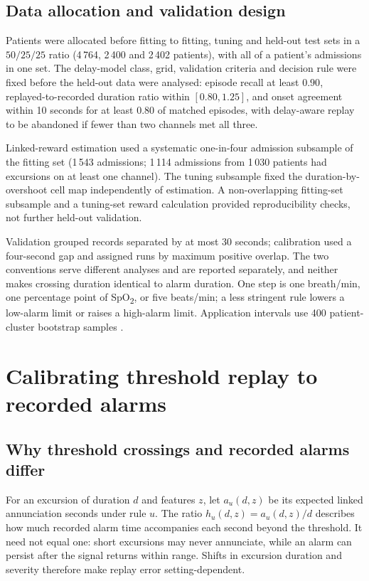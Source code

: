 \documentclass[11pt,letterpaper]{article}
\newcommand{\SpO}{SpO\textsubscript{2}}
\begin{document}
\subsection{Data allocation and validation design}\label{sec:design}

Patients were allocated before fitting to fitting, tuning and held-out test sets in a $50/25/25$ ratio (4\,764, 2\,400 and 2\,402 patients), with all of a patient's admissions in one set. The delay-model class, grid, validation criteria and decision rule were fixed before the held-out data were analysed: episode recall at least $0.90$, replayed-to-recorded duration ratio within $[0.80,1.25]$, and onset agreement within 10 seconds for at least $0.80$ of matched episodes, with delay-aware replay to be abandoned if fewer than two channels met all three.

Linked-reward estimation used a systematic one-in-four admission subsample of the fitting set (1\,543 admissions; 1\,114 admissions from 1\,030 patients had excursions on at least one channel). The tuning subsample fixed the duration-by-overshoot cell map independently of estimation. A non-overlapping fitting-set subsample and a tuning-set reward calculation provided reproducibility checks, not further held-out validation.

Validation grouped records separated by at most 30 seconds; calibration used a four-second gap and assigned runs by maximum positive overlap. The two conventions serve different analyses and are reported separately, and neither makes crossing duration identical to alarm duration. One step is one breath/min, one percentage point of \SpO{}, or five beats/min; a less stringent rule lowers a low-alarm limit or raises a high-alarm limit. Application intervals use 400 patient-cluster bootstrap samples \citep{efron1979bootstrap,davison1997bootstrap,field2007bootstrapping}.


\section{Calibrating threshold replay to recorded alarms}\label{sec:method}
\subsection{Why threshold crossings and recorded alarms differ}\label{sec:distortion}

For an excursion of duration $d$ and features $z$, let $a_u(d,z)$ be its expected linked annunciation seconds under rule $u$. The ratio $h_u(d,z)=a_u(d,z)/d$ describes how much recorded alarm time accompanies each second beyond the threshold. It need not equal one: short excursions may never annunciate, while an alarm can persist after the signal returns within range. Shifts in excursion duration and severity therefore make replay error setting-dependent.
\end{document}
